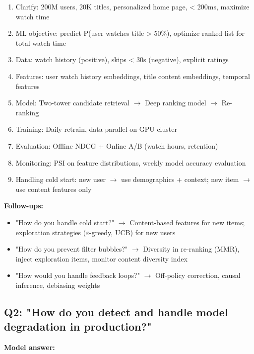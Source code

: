 \documentclass[11pt]{article}
\providecommand{\tightlist}{\setlength{\itemsep}{1pt}\setlength{\parskip}{0pt}}
\begin{document}
\begin{enumerate}
\def\labelenumi{\arabic{enumi}.}
\tightlist
\item
  Clarify: 200M users, 20K titles, personalized home page, \textless{} 200ms, maximize watch time
\item
  ML objective: predict P(user watches title \textgreater{} 50\%), optimize ranked list for total watch time
\item
  Data: watch history (positive), skips \textless{} 30s (negative), explicit ratings
\item
  Features: user watch history embeddings, title content embeddings, temporal features
\item
  Model: Two-tower candidate retrieval \(\rightarrow\) Deep ranking model \(\rightarrow\) Re-ranking
\item
  Training: Daily retrain, data parallel on GPU cluster
\item
  Evaluation: Offline NDCG + Online A/B (watch hours, retention)
\item
  Monitoring: PSI on feature distributions, weekly model accuracy evaluation
\item
  Handling cold start: new user \(\rightarrow\) use demographics + context; new item \(\rightarrow\) use content features only
\end{enumerate}

\textbf{Follow-ups:}

\begin{itemize}
\tightlist
\item
  "How do you handle cold start?" \(\rightarrow\) Content-based features for new items; exploration strategies (\(\varepsilon\)-greedy, UCB) for new users
\item
  "How do you prevent filter bubbles?" \(\rightarrow\) Diversity in re-ranking (MMR), inject exploration items, monitor content diversity index
\item
  "How would you handle feedback loops?" \(\rightarrow\) Off-policy correction, causal inference, debiasing weights
\end{itemize}

\subsection{Q2: "How do you detect and handle model degradation in production?"}\label{q2-how-do-you-detect-and-handle-model-degradation-in-production}

\textbf{Model answer:}
\end{document}
